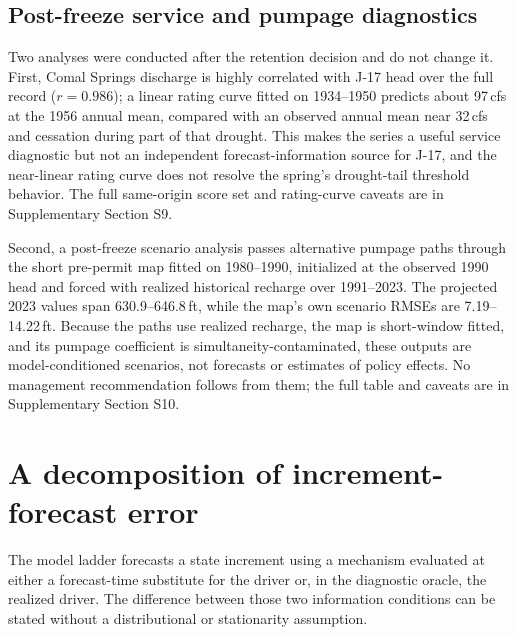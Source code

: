 \documentclass[11pt]{article}
\begin{document}
\subsection{Post-freeze service and pumpage diagnostics}

Two analyses were conducted after the retention decision and do not change it. First, Comal Springs discharge is highly correlated with J-17 head over the full record (\(r=0.986\)); a linear rating curve fitted on 1934--1950 predicts about 97\,cfs at the 1956 annual mean, compared with an observed annual mean near 32\,cfs and cessation during part of that drought. This makes the series a useful service diagnostic but not an independent forecast-information source for J-17, and the near-linear rating curve does not resolve the spring's drought-tail threshold behavior. The full same-origin score set and rating-curve caveats are in Supplementary Section S9.

Second, a post-freeze scenario analysis passes alternative pumpage paths through the short pre-permit map fitted on 1980--1990, initialized at the observed 1990 head and forced with realized historical recharge over 1991--2023. The projected 2023 values span 630.9--646.8\,ft, while the map's own scenario RMSEs are 7.19--14.22\,ft. Because the paths use realized recharge, the map is short-window fitted, and its pumpage coefficient is simultaneity-contaminated, these outputs are model-conditioned scenarios, not forecasts or estimates of policy effects. No management recommendation follows from them; the full table and caveats are in Supplementary Section S10.

\section{A decomposition of increment-forecast error}

The model ladder forecasts a state increment using a mechanism evaluated at either a forecast-time substitute for the driver or, in the diagnostic oracle, the realized driver. The difference between those two information conditions can be stated without a distributional or stationarity assumption.
\end{document}
